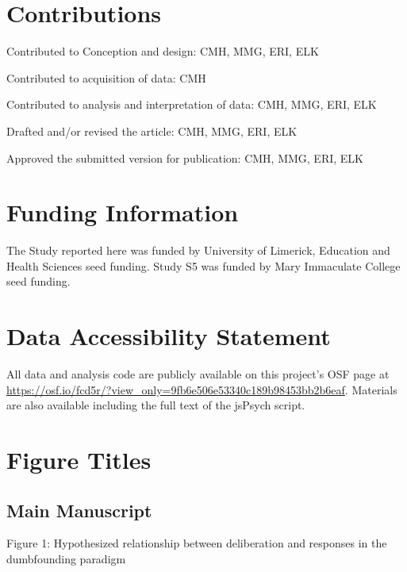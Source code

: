 

\hypertarget{contributions}{%
\section{Contributions}\label{contributions}}

Contributed to Conception and design: CMH, MMG, ERI, ELK

Contributed to acquisition of data: CMH

Contributed to analysis and interpretation of data: CMH, MMG, ERI, ELK

Drafted and/or revised the article: CMH, MMG, ERI, ELK

Approved the submitted version for publication: CMH, MMG, ERI, ELK

\hypertarget{funding-information}{%
\section{Funding Information}\label{funding-information}}

The Study reported here was funded by University of Limerick, Education
and Health Sciences seed funding. Study S5 was funded by Mary Immaculate
College seed funding.

\hypertarget{data-accessibility-statement}{%
\section{Data Accessibility
Statement}\label{data-accessibility-statement}}

All data and analysis code are publicly available on this project's OSF
page at
\url{https://osf.io/fcd5r/?view_only=9fb6e506e53340c189b98453bb2b6eaf}.
Materials are also available including the full text of the jsPsych
script.

\hypertarget{figure-titles}{%
\section{Figure Titles}\label{figure-titles}}

\hypertarget{main-manuscript}{%
\subsection{Main Manuscript}\label{main-manuscript}}

Figure 1: Hypothesized relationship between deliberation and responses
in the dumbfounding paradigm

